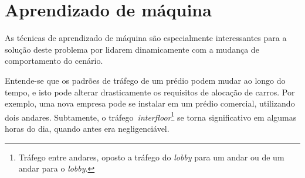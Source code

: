 \section{\label{section:machinelearning}Aprendizado de máquina}
As técnicas de aprendizado de máquina são especialmente interessantes para a
solução deste problema por lidarem dinamicamente com a mudança de comportamento
do cenário.

Entende-se que os padrões de tráfego de um prédio podem mudar ao longo do tempo,
e isto pode alterar drasticamente os requisitos de alocação de carros. Por
exemplo, uma nova empresa pode se instalar em um prédio comercial, utilizando
dois andares. Subtamente, o tráfego~\textit{interfloor}\footnote{Tráfego entre
  andares, oposto a tráfego do \textit{lobby} para um andar ou de um andar para
  o \textit{lobby}.} se torna significativo em algumas horas do dia, quando
antes era negligenciável.